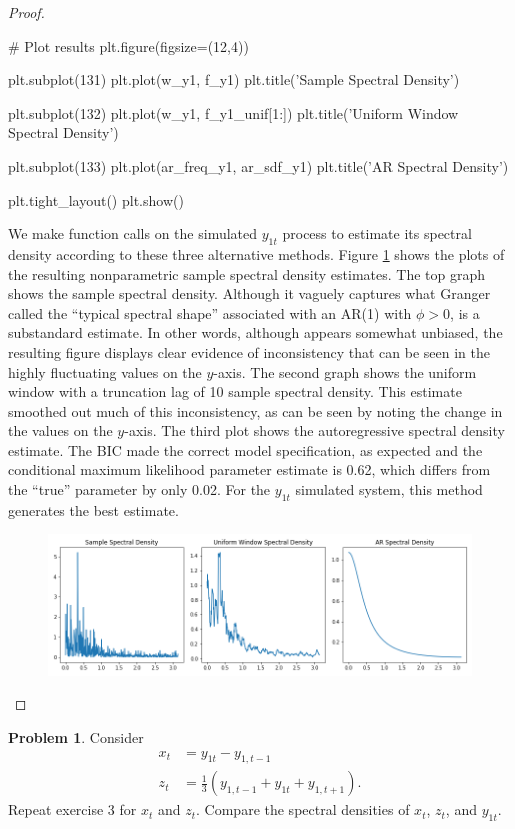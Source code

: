 \documentclass[oneside,reqno]{amsart}
\theoremstyle{definition}
\newtheorem{prob}{Problem}
\begin{document}
\begin{proof}
\begin{python3code}
# Plot results
plt.figure(figsize=(12,4))

plt.subplot(131)
plt.plot(w_y1, f_y1)
plt.title('Sample Spectral Density')

plt.subplot(132)
plt.plot(w_y1, f_y1_unif[1:])
plt.title('Uniform Window Spectral Density')

plt.subplot(133)
plt.plot(ar_freq_y1, ar_sdf_y1)
plt.title('AR Spectral Density')

plt.tight_layout()
plt.show()
\end{python3code}    

We make function calls on the simulated $y_{1t}$ process to estimate its spectral density according to these three alternative methods. Figure \ref{q3-fig} shows the plots of the resulting nonparametric sample spectral density estimates. The top graph shows the sample spectral density. Although it vaguely captures what Granger called the ``typical spectral shape'' associated with an AR(1) with $\phi > 0$, is a substandard estimate. In other words, although appears somewhat unbiased, the resulting figure displays clear evidence of inconsistency that can be seen in the highly fluctuating values on the $y$-axis. The second graph shows the uniform window with a truncation lag of 10 sample spectral density. This estimate smoothed out much of this inconsistency, as can be seen by noting the change in the values on the $y$-axis. The third plot shows the autoregressive spectral density estimate. The BIC made the correct model specification, as expected and the conditional maximum likelihood parameter estimate is 0.62, which differs from the ``true'' parameter by only 0.02. For the $y_{1t}$ simulated system, this method generates the best estimate. 

\begin{figure}
\includegraphics[width=\textwidth]{q3-fig}
\caption{}
\label{q3-fig}
\end{figure}
\end{proof}


\begin{prob}
Consider
\begin{align*}
	x_t &= y_{1t} - y_{1,t-1} \\ 
	z_t &= \frac{1}{3}(y_{1,t-1} + y_{1t} + y_{1,t+1}). 
\end{align*}
Repeat exercise 3 for $x_t$ and $z_t$. Compare the spectral densities of $x_t$, $z_t$, and $y_{1t}$. 
\end{prob}
\end{document}
